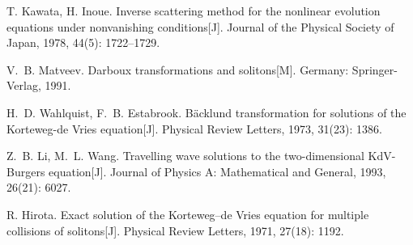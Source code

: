 \begin{thebibliography}{100}
\providecommand{\bibauthor}[1]{#1}
\providecommand{\bibeditor}[1]{#1}
\providecommand{\bibtranslator}[1]{#1}
\providecommand{\bibtitle}[1]{#1}
\providecommand{\bibbooktitle}[1]{#1}
\providecommand{\bibjournal}[1]{#1}
\providecommand{\bibmark}[1]{#1}
\providecommand{\bibcountry}[1]{#1}
\providecommand{\bibpatentid}[1]{#1}
\providecommand{\bibedition}[1]{#1}
\providecommand{\biborganization}[1]{#1}
\providecommand{\bibaddress}[1]{#1}
\providecommand{\bibpublisher}[1]{#1}
\providecommand{\bibinstitution}[1]{#1}
\providecommand{\bibschool}[1]{#1}
\providecommand{\bibvolume}[1]{#1}
\providecommand{\bibnumber}[1]{#1}
\providecommand{\bibversion}[1]{#1}
\providecommand{\bibpages}[1]{#1}
\providecommand{\bibmodifydate}[1]{#1}
\providecommand{\bibcitedate}[1]{#1}
\providecommand{\bibyear}[1]{#1}
\providecommand{\bibdate}[1]{#1}
\providecommand{\biburl}[1]{\newline\url{#1}}

\bibauthor{T. Kawata\@, H. Inoue}\@. \bibtitle{Inverse scattering method for
  the nonlinear evolution equations under nonvanishing
  conditions}\bibmark{[J]}\@. \bibjournal{Journal of the Physical Society of
  Japan}\@, \bibyear{1978}\@,
  \bibvolume{44}\bibnumber{(5)}\thinspace{}\textnormal{:
  }\bibpages{1722\thinspace{}\textnormal{--}\thinspace{}1729}\@.

\bibauthor{V.~B. Matveev}\@. \bibbooktitle{Darboux transformations and
  solitons}\bibmark{[M]}\@. \bibaddress{Germany}\thinspace{}\textnormal{:
  }\bibpublisher{Springer-Verlag}\@, \bibyear{1991}\@.

\bibauthor{H.~D. Wahlquist\@, F.~B. Estabrook}\@. \bibtitle{B{\"a}cklund
  transformation for solutions of the Korteweg-de Vries
  equation}\bibmark{[J]}\@. \bibjournal{Physical Review Letters}\@,
  \bibyear{1973}\@, \bibvolume{31}\bibnumber{(23)}\thinspace{}\textnormal{:
  }\bibpages{1386}\@.

\bibauthor{Z.~B. Li\@, M.~L. Wang}\@. \bibtitle{Travelling wave solutions to
  the two-dimensional KdV-Burgers equation}\bibmark{[J]}\@. \bibjournal{Journal
  of Physics A: Mathematical and General}\@, \bibyear{1993}\@,
  \bibvolume{26}\bibnumber{(21)}\thinspace{}\textnormal{: }\bibpages{6027}\@.

\bibauthor{R. Hirota}\@. \bibtitle{Exact solution of the Korteweg--de Vries
  equation for multiple collisions of solitons}\bibmark{[J]}\@.
  \bibjournal{Physical Review Letters}\@, \bibyear{1971}\@,
  \bibvolume{27}\bibnumber{(18)}\thinspace{}\textnormal{: }\bibpages{1192}\@.


\end{thebibliography}
